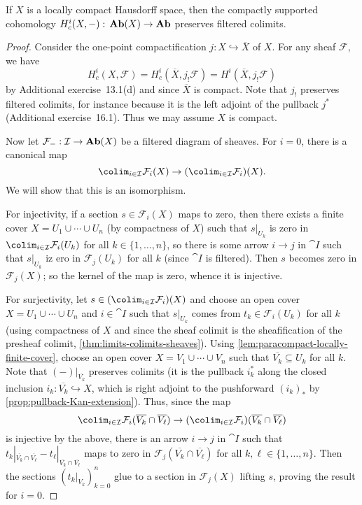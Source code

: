 \begin{lem}
If \(X\) is a locally compact Hausdorff space, then the compactly supported cohomology \(H^i_c(X,-)\colon\catAbelianSheaf(X)\to\catAbelianGroup\) preserves filtered colimits.
\end{lem}
\begin{proof}
Consider the one-point compactification \(j\colon X\hookrightarrow\overline{X}\) of \(X\).
For any sheaf \(\mathcal F\), we have
\[ H^i_c(X,\mathcal F) = H^i_c(\overline{X},j_!\mathcal F) = H^i(\overline{X},j_!\mathcal F) \]
by Additional exercise~13.1(d) and since \(\overline{X}\) is compact.
Note that \(j_!\) preserves filtered colimits, for instance because it is the left adjoint of the pullback \(j^*\) (Additional exercise~16.1).
Thus we may assume \(X\) is compact.

Now let \(\mathcal F_{-}\colon\cat I\to\catAbelianSheaf(X)\) be a filtered diagram of sheaves.
For \(i=0\), there is a canonical map
\[ \colim_{i\in\cat I}\mathcal F_i(X) \to (\colim_{i\in\cat I}\mathcal F_i)(X)\text{.} \]
We will show that this is an isomorphism.

For injectivity, if a section \(s\in\mathcal F_i(X)\) maps to zero, then there exists a finite cover \(X=U_1\cup\cdots\cup U_n\) (by compactness of \(X\)) such that \(s|_{U_k}\) is zero in \(\colim_{i\in\cat I}\mathcal F_i(U_k)\) for all \(k\in\{1,\ldots,n\}\), so there is some arrow \(i\to j\) in \(\cat I\) such that \(s|_{U_k}\) iz ero in \(\mathcal F_j(U_k)\) for all \(k\) (since \(\cat I\) is filtered).
Then \(s\) becomes zero in \(\mathcal F_j(X)\); so the kernel of the map is zero, whence it is injective.

For surjectivity, let \(s\in(\colim_{i\in\cat I}\mathcal F_i)(X)\) and choose an open cover \(X=U_1\cup\cdots\cup U_n\) and \(i\in\cat I\) such that \(s|_{U_k}\) comes from \(t_k\in\mathcal F_i(U_k)\) for all \(k\) (using compactness of \(X\) and since the sheaf colimit is the sheafification of the presheaf colimit, \cref{thm:limits-colimits-sheaves}).
Using \cref{lem:paracompact-locally-finite-cover}, choose an open cover \(X=V_1\cup\cdots\cup V_n\) such that \(\overline{V_k}\subseteq U_k\) for all \(k\).
Note that \((-)|_{\overline{V_k}}\) preserves colimits (it is the pullback \(i_k^*\) along the closed inclusion \(i_k\colon\overline{V_k}\hookrightarrow X\), which is right adjoint to the pushforward \((i_k)_*\) by \cref{prop:pullback-Kan-extension}).
Thus, since the map
\[ \colim_{i\in\cat I}\mathcal F_i(\overline{V_k}\cap\overline{V_\ell}) \to (\colim_{i\in\cat I}\mathcal F_i)(\overline{V_k}\cap\overline{V_\ell}) \]
is injective by the above, there is an arrow \(i\to j\) in \(\cat I\) such that \(t_k|_{\overline{V_k}\cap\overline{V_\ell}}-t_\ell|_{\overline{V_k}\cap\overline{V_\ell}}\) maps to zero in \(\mathcal F_j(\overline{V_k}\cap\overline{V_\ell})\) for all \(k,\ell\in\{1,\ldots,n\}\).
Then the sections \((t_k|_{V_k})_{k=0}^n\) glue to a section in \(\mathcal F_j(X)\) lifting \(s\), proving the result for \(i=0\).


\end{proof}
